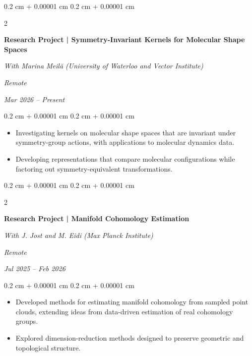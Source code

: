 \documentclass[10pt, letterpaper]{article}
\newenvironment{highlights}{
    \begin{itemize}[
        topsep=0.05 cm,
        parsep=0.04 cm,
        partopsep=0pt,
        itemsep=0pt,
        leftmargin=0.4 cm + 10pt
    ]
}{
    \end{itemize}
} %
\newenvironment{onecolentry}{
    \begin{adjustwidth}{
        0.2 cm + 0.00001 cm
    }{
        0.2 cm + 0.00001 cm
    }
}{
    \end{adjustwidth}
} %
\newenvironment{twocolentry}[2][]{
    \onecolentry
    \def\secondColumn{#2}
    \setcolumnwidth{\fill, 4.5 cm}
    \begin{paracol}{2}
}{
    \switchcolumn \raggedleft \secondColumn
    \end{paracol}
    \endonecolentry
} %
\begin{document}
        \vspace{0.14 cm}

        \begin{twocolentry}{
            \textit{Remote}

            \textit{Mar 2026 -- Present}}
            \textbf{Research Project | Symmetry-Invariant Kernels for Molecular Shape Spaces}

            \textit{With Marina Meil\u{a} (University of Waterloo and Vector Institute)}
        \end{twocolentry}

        \vspace{0.08 cm}
        \begin{onecolentry}
            \begin{highlights}
                \item Investigating kernels on molecular shape spaces that are invariant under symmetry-group actions, with applications to molecular dynamics data.
                \item Developing representations that compare molecular configurations while factoring out symmetry-equivalent transformations.
            \end{highlights}
        \end{onecolentry}

        \vspace{0.14 cm}

        \begin{twocolentry}{
            \textit{Remote}

            \textit{Jul 2025 -- Feb 2026}}
            \textbf{Research Project | Manifold Cohomology Estimation}

            \textit{With J. Jost and M. Eidi (Max Planck Institute)}
        \end{twocolentry}

        \vspace{0.08 cm}
        \begin{onecolentry}
            \begin{highlights}
                \item Developed methods for estimating manifold cohomology from sampled point clouds, extending ideas from data-driven estimation of real cohomology groups.
                \item Explored dimension-reduction methods designed to preserve geometric and topological structure.
            \end{highlights}
        \end{onecolentry}
\end{document}
